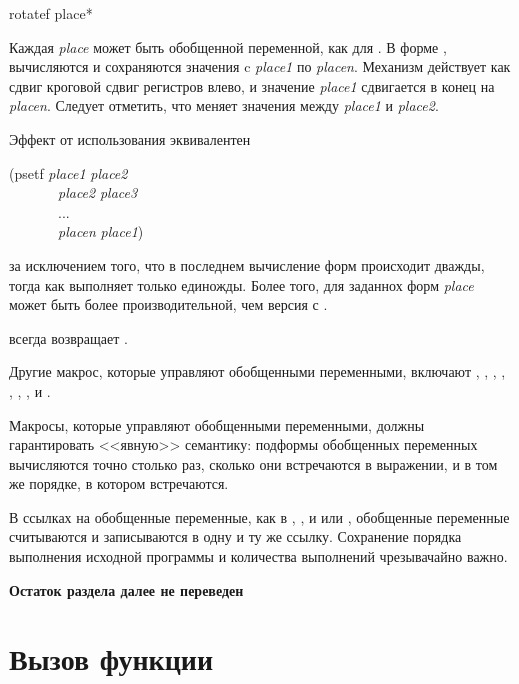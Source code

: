\begin{defmac}
rotatef {place}*

Каждая \emph{place} может быть обобщенной переменной, как для .
В форме ,
вычисляются и сохраняются значения c \emph{place1} по \emph{placen}.
Механизм действует как сдвиг кроговой сдвиг регистров влево, и значение
\emph{place1} сдвигается в конец на \emph{placen}.
Следует отметить, что  меняет значения
между \emph{place1} и \emph{place2}.

Эффект от использования  эквивалентен
\begin{lisp}
(psetf \emph{place1} \emph{place2} \\
~~~~~~~\emph{place2} \emph{place3} \\
~~~~~~~... \\
~~~~~~~\emph{placen} \emph{place1})
\end{lisp}
за исключением того, что в последнем вычисление форм происходит дважды, тогда как  выполняет только единожды.
Более того, для заданнох форм \emph{place}  может быть более
производительной, чем версия с .

 всегда возвращает {\false}.
\end{defmac}

Другие макрос, которые управляют обобщенными переменными, включают 
, ,
, , , ,
,  и .

Макросы, которые управляют обобщенными переменными, должны гарантировать
<<явную>> семантику: подформы обобщенных переменных вычисляются точно столько
раз, сколько они встречаются в выражении, и в том же порядке, в котором
встречаются.

В ссылках на обобщенные переменные, как в , ,  и
 или , обобщенные переменные считываются и записываются в
одну и ту же ссылку. Сохранение порядка выполнения исходной программы и
количества выполнений чрезывачайно важно.

\textbf{Остаток раздела далее не переведен}

\section{Вызов функции}

